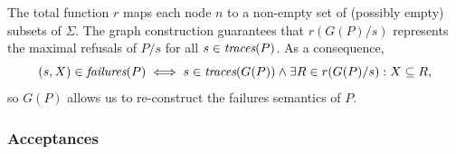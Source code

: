 The total function $r$ maps each node $n$ to a non-empty set of  (possibly
empty) subsets of $\Sigma$. The graph construction guarantees that
$r(G(P)/s)$ represents the maximal refusals of $P/s$ for all $s\in\text{\it traces}(P)$.
As a consequence,
\begin{equation}\label{eq:refsAndR}
(s,X)\in\text{\it failures}(P) \iff s\in\text{\it traces}(G(P)) \wedge \exists R\in r(G(P)/s): X\subseteq R,
\end{equation}
so $G(P)$ allows us to re-construct the failures semantics of $P$.


\subsubsection*{Acceptances}
\label{sec:accs}

